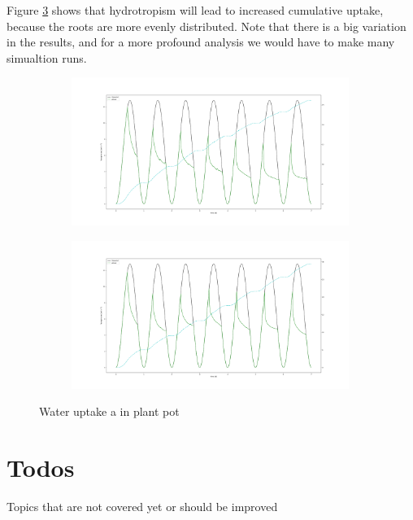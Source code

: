 Figure \ref{fig:example7c} shows that hydrotropism will lead to increased cumulative uptake, because the roots are more evenly distributed. Note that there is a big variation in the results, and for a more profound analysis we would have to make many simualtion runs. 

\begin{figure}
\begin{subfigure}[c]{1\textwidth}
\includegraphics[width=0.99\textwidth]{example7c_no_hydro.png}
 \label{fig:example7c}
\end{subfigure}
\begin{subfigure}[c]{1\textwidth}
\includegraphics[width=0.99\textwidth]{example7c_simple_hydro.png}
 \label{fig:example7c_hydro}
\end{subfigure}
\caption{Water uptake a in plant pot} \label{fig:example7c}
\end{figure}







\newpage
\section{Todos}
Topics that are not covered yet or should be improved

